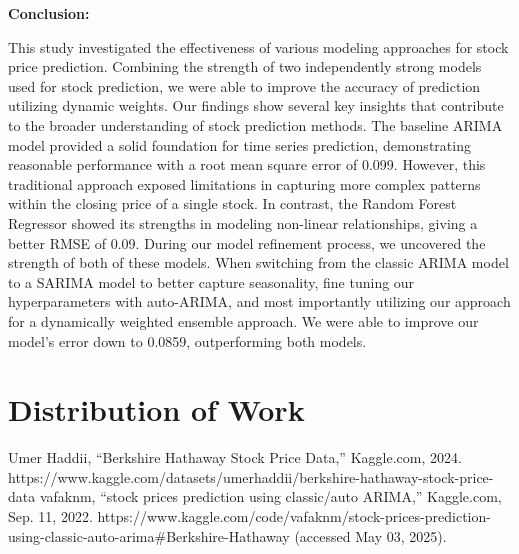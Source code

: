\documentclass[conference]{IEEEtran}
\begin{document}
\textbf{Conclusion:}

This study investigated the effectiveness of various modeling approaches for stock price prediction. Combining the strength of two independently strong models used for stock prediction, we were able to improve the accuracy of prediction utilizing dynamic weights. Our findings show several key insights that contribute to the broader understanding of stock prediction methods. 
The baseline ARIMA model provided a solid foundation for time series prediction, demonstrating reasonable performance with a root mean square error of 0.099. However, this traditional approach exposed limitations in capturing more complex patterns within the closing price of a single stock. In contrast, the Random Forest Regressor showed its strengths in modeling non-linear relationships, giving a better RMSE of 0.09. 
During our model refinement process, we uncovered the strength of both of these models. When switching from the classic ARIMA model to a SARIMA model to better capture seasonality, fine tuning our hyperparameters with auto-ARIMA, and most importantly utilizing our approach for a dynamically weighted ensemble approach. We were able to improve our model’s error down to 0.0859, outperforming both models.

\section{Distribution of Work}

\begin{thebibliography}{00}
 Umer Haddii, “Berkshire Hathaway Stock Price Data,” Kaggle.com, 2024. https://www.kaggle.com/datasets/umerhaddii/berkshire-hathaway-stock-price-data
 vafaknm, “stock prices prediction using classic/auto ARIMA,” Kaggle.com, Sep. 11, 2022. https://www.kaggle.com/code/vafaknm/stock-prices-prediction-using-classic-auto-arima\#Berkshire-Hathaway (accessed May 03, 2025).
\end{thebibliography}
\end{document}
